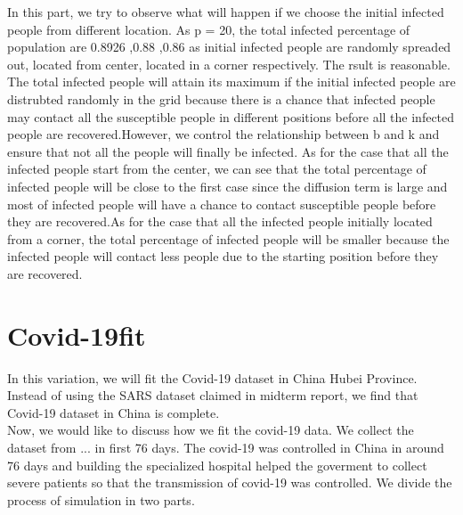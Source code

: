 \documentclass{article}
\begin{document}
 In this part, we try to observe what will happen if we choose the initial infected people from different location. As p = 20, the total infected percentage of population are 0.8926 ,0.88 ,0.86 as initial infected people are randomly spreaded out, located from center, located in a corner respectively. The rsult is reasonable. The total infected people will attain its maximum if the initial infected people are distrubted randomly in the grid because there is a chance that infected people may contact all the susceptible people in different positions before all the infected people are recovered.However, we control the relationship between b and k and ensure that not all the people will finally be infected.
 As for the case that all the infected people start from the center, we can see that the total percentage of infected people will be close to the first case since the diffusion term is large  and most of infected people will have a chance to contact susceptible people before they are recovered.As for the case that all the infected people initially located from a corner, the total percentage of infected people will be smaller because the infected people will contact less people due to the starting position before they are recovered.


 \section{Covid-19fit}
 In this variation, we will fit the Covid-19 dataset in China Hubei Province. Instead of using the SARS dataset claimed in midterm report, we find that Covid-19 dataset in China is complete. \\

Now, we would like to discuss how we fit the covid-19 data. We collect the dataset from ... in first 76 days. The covid-19 was controlled in China in around 76 days and building the specialized hospital helped the goverment to collect severe patients so that the transmission of covid-19 was controlled. We divide the process of simulation in two parts. 
\end{document}

